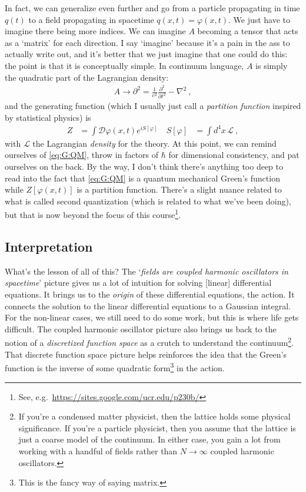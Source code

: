 In fact, we can generalize even further and go from a particle propagating in time $q(t)$ to a field propagating in spacetime $q(x,t) = \varphi(x,t)$. We just have to imagine there being more indices. We can imagine $A$ becoming a tensor that acts as a `matrix' for each direction. I say `imagine' because it's a pain in the ass to actually write out, and it's better that we just imagine that one could do this: the point is that it is conceptually simple. 
In continuum language, $A$ is simply the quadratic part of the Lagrangian density:
\begin{align}
	A\to \partial^2 = \frac{1}{c^2} \frac{\partial^2}{\partial t^2} - \nabla^2 \ ,
\end{align}
and the generating function (which I usually just call a \emph{partition function} inspired by statistical physics) is
\begin{align}
	Z &= \int \mathcal D\varphi(x,t) e^{iS[\varphi]} \ 
	&
	S[\varphi] &= \int d^4x \, \mathcal L \ ,
\end{align}
with $\mathcal L$ the Lagrangian \emph{density} for the theory. At this point, we can remind ourselves of \eqref{eq:G:QM}, throw in factors of $\hbar$ for dimensional consistency, and pat ourselves on the back. By the way, I don't think there's anything too deep to read into the fact that \eqref{eq:G:QM} is a quantum mechanical Green's function while $Z[\varphi(x,t)]$ is a partition function. There's a slight nuance related to what is called second quantization (which is related to what we've been doing), but that is now beyond the focus of this course\footnote{See, e.g.~\url{https://sites.google.com/ucr.edu/p230b/}}.

\subsection{Interpretation}

What's the lesson of all of this? The `\emph{fields are coupled harmonic oscillators in spacetime}' picture gives us a lot of intuition for solving [linear] differential equations. It brings us to the \emph{origin} of these differential equations, the action. It connects the solution to the linear differential equations to a Gaussian integral. For the non-linear cases, we still need to do some work, but this is where life gets difficult. The coupled harmonic oscillator picture also brings us back to the notion of a \emph{discretized function space} as a crutch to understand the continuum\footnote{If you're a condensed matter physicist, then the lattice holds some physical significance. If you're a particle physicist, then you assume that the lattice is just a coarse model of the continuum. In either case, you gain a lot from working with a handful of fields rather than $N\to \infty$ coupled harmonic oscillators.}. That discrete function space picture helps reinforces the idea that the Green's function is the inverse of some quadratic form\footnote{This is the fancy way of saying matrix.} in the action. 

